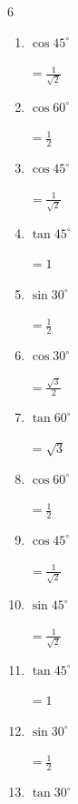 \begin{multicols}{6}
\begin{enumerate}
  \item $\displaystyle \cos{45^\circ}$

        $\displaystyle =\frac{1}{\sqrt{2}}$

  \item $\displaystyle \cos{60^\circ}$

        $\displaystyle =\frac{1}{2}$

  \item $\displaystyle \cos{45^\circ}$

        $\displaystyle =\frac{1}{\sqrt{2}}$

  \item $\displaystyle \tan{45^\circ}$

        $\displaystyle =1$

  \item $\displaystyle \sin{30^\circ}$

        $\displaystyle =\frac{1}{2}$

  \item $\displaystyle \cos{30^\circ}$

        $\displaystyle =\frac{\sqrt{3}}{2}$

  \item $\displaystyle \tan{60^\circ}$

        $\displaystyle =\sqrt{3}$

  \item $\displaystyle \cos{60^\circ}$

        $\displaystyle =\frac{1}{2}$

\columnbreak %

\resetques

  \item $\displaystyle \cos{45^\circ}$

        $\displaystyle =\frac{1}{\sqrt{2}}$

  \item $\displaystyle \sin{45^\circ}$

        $\displaystyle =\frac{1}{\sqrt{2}}$

  \item $\displaystyle \tan{45^\circ}$

        $\displaystyle =1$

  \item $\displaystyle \sin{30^\circ}$

        $\displaystyle =\frac{1}{2}$

  \item $\displaystyle \tan{30^\circ}$


\end{enumerate}
\end{multicols}

